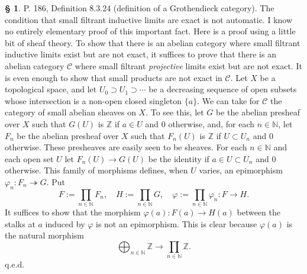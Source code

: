 \documentclass[12pt]{article}
\theoremstyle{remark}
\theoremstyle{definition}
\newtheorem{s}[thm]{\S}
\newcommand{\nn}{\noindent}
\newcommand{\C}{\mathcal C}
\newcommand{\epi}{\twoheadrightarrow}
\begin{document}
\nn[\S\ref{adic} p.~\pageref{adic} will be inserted here.]
%
\begin{s} 
P. 186, Definition 8.3.24 (definition of a Grothendieck category). The condition that small filtrant inductive limits are exact is not automatic. I know no entirely elementary proof of this important fact. Here is a proof using a little bit of sheaf theory. To show that there is an abelian category where small filtrant inductive limits exist but are not exact, it suffices to prove that there is an abelian category $\C$ where small filtrant {\em projective} limits exist but are not exact. It is even enough to show that small products are not exact in $\C$. Let $X$ be a topological space, and let $U_0\supset U_1\supset\cdots$ be a decreasing sequence of open subsets whose intersection is a non-open closed singleton $\{a\}$. We can take for $\C$ the category of small abelian sheaves on $X$. To see this, let $G$ be the abelian presheaf over $X$ such that $G(U)$ is $\mathbb Z$ if $a\in U$ and 0 otherwise, and, for each $n\in\mathbb N$, let $F_n$ be the abelian presheaf over $X$ such that $F_n(U)$ is $\mathbb Z$ if $U\subset U_n$ and 0 otherwise. These presheaves are easily seen to be sheaves. For each $n\in\mathbb N$ and each open set $U$ let $F_n(U)\to G(U)$ be the identity if $a\in U\subset U_n$ and 0 otherwise. This family of morphisms defines, when $U$ varies, an epimorphism $\varphi_n:F_n\epi G$. Put 
$$
F:=\prod_{n\in\mathbb N}F_n,\quad H:=\prod_{n\in\mathbb N}G,\quad\varphi:=\prod_{n\in\mathbb N}\varphi_n:F\to H.
$$ 
It suffices to show that the morphism $\varphi(a):F(a)\to H(a)$ between the stalks at $a$ induced by $\varphi$ is not an epimorphism. This is clear because $\varphi(a)$ is the natural morphism 
$$
\bigoplus_{n\in\mathbb N}\mathbb Z\to\prod_{n\in\mathbb N}\mathbb Z.
$$
q.e.d.
\end{s}
%
%
\end{document}
